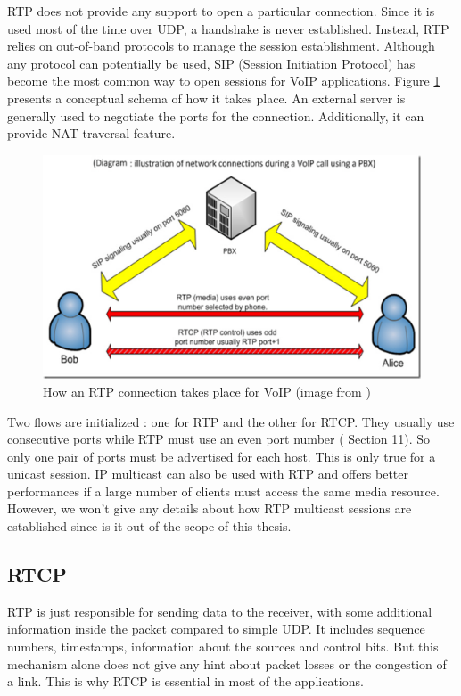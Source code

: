 RTP does not provide any support to open a particular connection. Since it is used most of the time over UDP, a handshake is never established. Instead, RTP relies on out-of-band protocols to manage the session establishment. Although any protocol can potentially be used, SIP (Session Initiation Protocol) has become the most common way to open sessions for VoIP applications. Figure \ref{fig:rtp-sip} presents a conceptual schema of how it takes place. An external server is generally used to negotiate the ports for the connection. Additionally, it can provide NAT traversal feature.
\newpage
\begin{figure}[!ht]
\centering
\includegraphics[width=0.9\linewidth]{images/rtp_sip}
\caption[VoIP with RTP connection]{How an RTP connection takes place for VoIP (image from \cite{rtp-sip})}
\label{fig:rtp-sip}
\end{figure}


Two flows are initialized : one for RTP and the other for RTCP. They usually use consecutive ports while RTP must use an even port number (\cite{RFC3550} Section 11). So only one pair of ports must be advertised for each host. This is only true for a unicast session. IP multicast can also be used with RTP and offers better performances if a large number of clients must access the same media resource. However, we won't give any details about how RTP multicast sessions are established since is it out of the scope of this thesis.

\subsection{RTCP}\label{ssec:rtcp}

RTP is just responsible for sending data to the receiver, with some additional information inside the packet compared to simple UDP. It includes sequence numbers, timestamps, information about the sources and control bits. But this mechanism alone does not give any hint about packet losses or the congestion of a link. This is why RTCP is essential in most of the applications.

